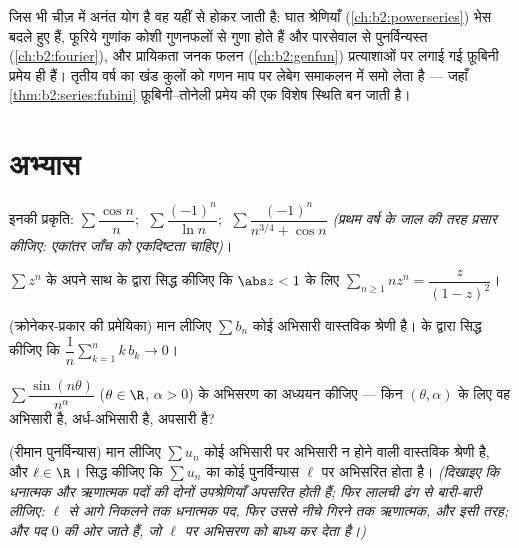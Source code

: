 \begin{remark}[यह अध्याय कहाँ काम आता है]
जिस भी चीज़ में अनंत योग है वह यहीं से होकर जाती है: घात श्रेणियाँ (\cref{ch:b2:powerseries})
भेस बदले हुए  हैं, फूरिये गुणांक कोशी गुणनफलों से गुणा होते हैं
और पारसेवाल से पुनर्विन्यस्त (\cref{ch:b2:fourier}), और प्रायिकता जनक फलन (\cref{ch:b2:genfun})
प्रत्याशाओं पर लगाई गई फ़ूबिनी प्रमेय ही हैं। तृतीय वर्ष का खंड 
कुलों को गणन माप पर लेबेग समाकलन में समो लेता है --- जहाँ \cref{thm:b2:series:fubini}
फ़ूबिनी--तोनेली प्रमेय की एक विशेष स्थिति बन जाती है।
\end{remark}

\section{अभ्यास}

\begin{exercise}[$\star$]\label{exo:b2:series:1}
इनकी प्रकृति: $\sum \dfrac{\cos n}{n}$; $\;\sum \dfrac{(-1)^n}{\ln
n}$; $\;\sum \dfrac{(-1)^n}{n^{3/4} + \cos n}$ \emph{(प्रथम वर्ष के जाल की तरह प्रसार
कीजिए: एकांतर जाँच को एकदिष्टता चाहिए)}।
\end{exercise}

\begin{exercise}[$\star$]\label{exo:b2:series:2}
$\sum z^n$ के अपने साथ  के द्वारा सिद्ध कीजिए कि $\abs z < 1$ के लिए $\sum_{n\geq1} n z^{n} =
\dfrac{z}{(1-z)^2}$।
\end{exercise}

\begin{exercise}[$\star\star$]\label{exo:b2:series:3}
(क्रोनेकर-प्रकार की प्रमेयिका) मान लीजिए $\sum b_n$ कोई अभिसारी वास्तविक
श्रेणी है।  के द्वारा सिद्ध कीजिए कि $\dfrac{1}{n}\sum_{k=1}^{n} k\,b_k
\to 0$।
\end{exercise}

\begin{exercise}[$\star\star$]\label{exo:b2:series:4}
$\sum \dfrac{\sin(n\theta)}{n^\alpha}$ ($\theta \in \R$, $\alpha > 0$) के अभिसरण का अध्ययन कीजिए --- किन $(\theta, \alpha)$ के लिए वह  अभिसारी है, अर्ध-अभिसारी है, अपसारी है?
\end{exercise}

\begin{exercise}[$\star\star\star$]\label{exo:b2:series:5}
(रीमान पुनर्विन्यास) मान लीजिए $\sum u_n$ कोई अभिसारी पर 
अभिसारी न होने वाली वास्तविक श्रेणी है, और $\ell \in \R$। सिद्ध कीजिए कि $\sum u_n$ का
कोई पुनर्विन्यास $\ell$ पर अभिसरित होता है। \emph{(दिखाइए कि धनात्मक और
ऋणात्मक पदों की दोनों उपश्रेणियाँ अपसरित होती हैं; फिर लालची ढंग से
बारी-बारी लीजिए: $\ell$ से आगे निकलने तक धनात्मक पद, फिर उससे नीचे गिरने
तक ऋणात्मक, और इसी तरह; और पद $0$ की ओर जाते हैं, जो $\ell$ पर अभिसरण को
बाध्य कर देता है।)}
\end{exercise}

